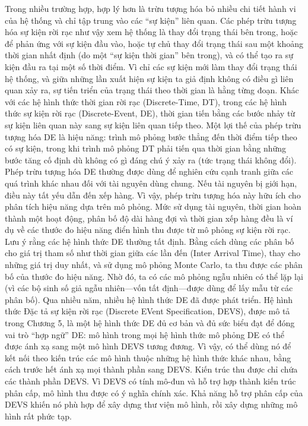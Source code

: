 Trong nhiều trường hợp, hợp lý hơn là trừu tượng hóa bỏ nhiều chi tiết hành vi của hệ thống và chỉ tập trung vào các ``sự kiện'' liên quan. Các phép trừu tượng hóa sự kiện rời rạc như vậy xem hệ thống là thay đổi trạng thái bên trong, hoặc để phản ứng với sự kiện đầu vào, hoặc tự chủ thay đổi trạng thái sau một khoảng thời gian nhất định (do một ``sự kiện thời gian'' bên trong), và có thể tạo ra sự kiện đầu ra tại một số thời điểm. Vì chỉ các sự kiện mới làm thay đổi trạng thái hệ thống, và giữa những lần xuất hiện sự kiện ta giả định không có điều gì liên quan xảy ra, sự tiến triển của trạng thái theo thời gian là hằng từng đoạn. Khác với các hệ hình thức thời gian rời rạc (Discrete-Time, DT), trong các hệ hình thức sự kiện rời rạc (Discrete-Event, DE), thời gian tiến bằng các bước nhảy từ sự kiện liên quan này sang sự kiện liên quan tiếp theo. Một lợi thế của phép trừu tượng hóa DE là hiệu năng: trình mô phỏng bước thẳng đến thời điểm tiếp theo có sự kiện, trong khi trình mô phỏng DT phải tiến qua thời gian bằng những bước tăng cố định dù không có gì đáng chú ý xảy ra (tức trạng thái không đổi). Phép trừu tượng hóa DE thường được dùng để nghiên cứu cạnh tranh giữa các quá trình khác nhau đối với tài nguyên dùng chung. Nếu tài nguyên bị giới hạn, điều này tất yếu dẫn đến xếp hàng. Vì vậy, phép trừu tượng hóa này hữu ích cho phân tích hiệu năng dựa trên mô phỏng. Mức sử dụng tài nguyên, thời gian hoàn thành một hoạt động, phân bố độ dài hàng đợi và thời gian xếp hàng đều là ví dụ về các thước đo hiệu năng điển hình thu được từ mô phỏng sự kiện rời rạc. Lưu ý rằng các hệ hình thức DE thường tất định. Bằng cách dùng các phân bố cho giá trị tham số như thời gian giữa các lần đến (Inter Arrival Time), thay cho những giá trị duy nhất, và sử dụng mô phỏng Monte Carlo, ta thu được các phân bố của thước đo hiệu năng. Nhờ đó, ta có các mô phỏng ngẫu nhiên có thể lặp lại (vì các bộ sinh số giả ngẫu nhiên---vốn tất định---được dùng để lấy mẫu từ các phân bố). Qua nhiều năm, nhiều hệ hình thức DE đã được phát triển. Hệ hình thức Đặc tả sự kiện rời rạc (Discrete EVent Specification, DEVS), được mô tả trong Chương 5, là một hệ hình thức DE đủ cơ bản và đủ sức biểu đạt để đóng vai trò ``hợp ngữ'' DE: mô hình trong mọi hệ hình thức mô phỏng DE có thể được ánh xạ sang một mô hình DEVS tương đương. Vì vậy, có thể dùng nó để kết nối theo kiến trúc các mô hình thuộc những hệ hình thức khác nhau, bằng cách trước hết ánh xạ mọi thành phần sang DEVS. Kiến trúc thu được chỉ chứa các thành phần DEVS. Vì DEVS có tính mô-đun và hỗ trợ hợp thành kiến trúc phân cấp, mô hình thu được có ý nghĩa chính xác. Khả năng hỗ trợ phân cấp của DEVS khiến nó phù hợp để xây dựng thư viện mô hình, rồi xây dựng những mô hình rất phức tạp.

